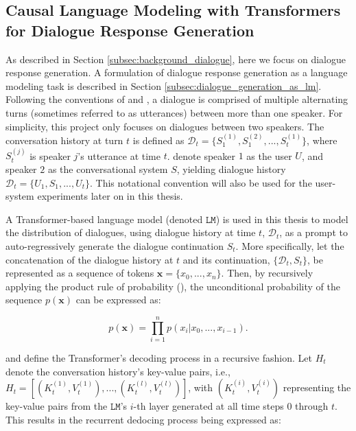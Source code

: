\subsection{Causal Language Modeling with Transformers for Dialogue Response Generation}
As described in Section \ref{subsec:background_dialogue}, here we focus on dialogue response generation. A formulation of dialogue response generation as a language modeling task is described in Section \ref{subsec:dialogue_generation_as_lm}. Following the conventions of \cite{dathathri2019plug} and \cite{madotto-etal-2020-plug}, a dialogue is comprised of multiple alternating turns (sometimes referred to as utterances) between more than one speaker. For simplicity, this project only focuses on dialogues between two speakers. The conversation history at turn $t$ is defined as $\mathcal{D}_t = \{S^{(1)}_1, S^{(2)}_1, ..., S^{(1)}_t\}$, where $S^{(j)}_t$ is speaker $j$'s utterance at time $t$. \cite{madotto-etal-2020-plug} denote speaker $1$ as the user $U$, and speaker $2$ as the conversational system $S$, yielding dialogue history $\mathcal{D}_t = \{U_1, S_1, ..., U_t\}$. This notational convention will also be used for the user-system experiments later on in this thesis.

A Transformer-based language model (denoted $\texttt{LM}$) is used in this thesis to model the distribution of dialogues, using dialogue history at time $t$, $\mathcal{D}_t$, as a prompt to auto-regressively generate the dialogue continuation $S_t$. More specifically, let the concatenation of the dialogue history at $t$ and its continuation, $\{\mathcal{D}_t, S_t\}$, be represented as a sequence of tokens $\textbf{x}= \{x_0, ..., x_n\}$. Then, by recursively applying the product rule of probability (\cite{bishop2006pattern}), the unconditional probability of the sequence $p(\textbf{x})$ can be expressed as:

\begin{equation}
    p(\textbf{x}) = \prod_{i = 1}^n p(x_i | x_0, ..., x_{i - 1}).
\end{equation}

\cite{dathathri2019plug} and \cite{madotto-etal-2020-plug} define the Transformer's decoding process in a recursive fashion. Let $H_t$ denote the conversation history's key-value pairs, i.e., $H_t = \left[ (K_t^{(1)}, V_t^{(1)}), ..., (K_t^{(l)}, V_t^{(l)}) \right]$, with $(K_t^{(i)}, V_t^{(i)})$ representing the key-value pairs from the $\texttt{LM}$'s $i$-th layer generated at all time steps $0$ through $t$. This results in the recurrent dedocing process being expressed as:

